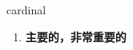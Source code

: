 
\begin{frame}
{\huge cardinal}
\begin{center}
\begin{enumerate}\Large
  \item \textbf{主要的，非常重要的}
\end{enumerate}
\end{center}
\end{frame}
